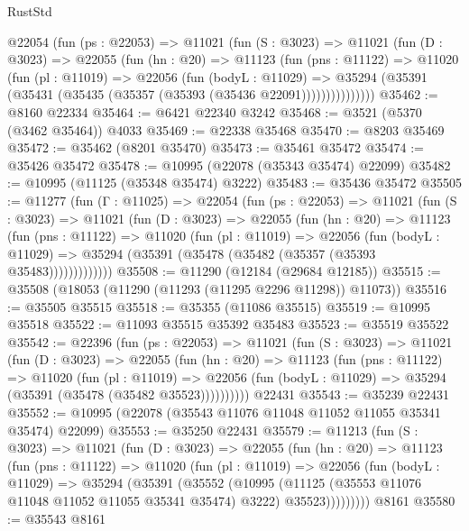 \begin{lexlean}{RustStd}
\begin{coremodule}
      @22054
        (fun (ps : @22053) =>
        @11021
          (fun (S : @3023) =>
          @11021
            (fun (D : @3023) =>
            @22055
              (fun (hn : @20) =>
              @11123
                (fun (pns : @11122) =>
                @11020
                  (fun (pl : @11019) =>
                  @22056
                    (fun (bodyL : @11029) =>
                    @35294 (@35391 (@35431 (@35435 (@35357 (@35393 (@35436 @22091)))))))))))))))
@35462 := @8160 @22334
@35464 := @6421 @22340 @3242
@35468 := @3521 (@5370 (@3462 @35464)) @4033
@35469 := @22338 @35468
@35470 := @8203 @35469
@35472 := @35462 (@8201 @35470)
@35473 := @35461 @35472
@35474 := @35426 @35472
@35478 := @10995 (@22078 (@35343 @35474) @22099)
@35482 := @10995 (@11125 (@35348 @35474) @3222)
@35483 := @35436 @35472
@35505 := @11277
    (fun (Γ : @11025) =>
    @22054
      (fun (ps : @22053) =>
      @11021
        (fun (S : @3023) =>
        @11021
          (fun (D : @3023) =>
          @22055
            (fun (hn : @20) =>
            @11123
              (fun (pns : @11122) =>
              @11020
                (fun (pl : @11019) =>
                @22056
                  (fun (bodyL : @11029) =>
                  @35294 (@35391 (@35478 (@35482 (@35357 (@35393 @35483)))))))))))))
@35508 := @11290 (@12184 (@29684 @12185))
@35515 := @35508 (@18053 (@11290 (@11293 (@11295 @2296 @11298)) @11073))
@35516 := @35505 @35515
@35518 := @35355 (@11086 @35515)
@35519 := @10995 @35518
@35522 := @11093 @35515 @35392 @35483
@35523 := @35519 @35522
@35542 := @22396
    (fun (ps : @22053) =>
    @11021
      (fun (S : @3023) =>
      @11021
        (fun (D : @3023) =>
        @22055
          (fun (hn : @20) =>
          @11123
            (fun (pns : @11122) =>
            @11020
              (fun (pl : @11019) =>
              @22056 (fun (bodyL : @11029) => @35294 (@35391 (@35478 (@35482 @35523))))))))))
    @22431
@35543 := @35239 @22431
@35552 := @10995 (@22078 (@35543 @11076 @11048 @11052 @11055 @35341 @35474) @22099)
@35553 := @35250 @22431
@35579 := @11213
    (fun (S : @3023) =>
    @11021
      (fun (D : @3023) =>
      @22055
        (fun (hn : @20) =>
        @11123
          (fun (pns : @11122) =>
          @11020
            (fun (pl : @11019) =>
            @22056
              (fun (bodyL : @11029) =>
              @35294
                (@35391
                  (@35552
                    (@10995
                      (@11125 (@35553 @11076 @11048 @11052 @11055 @35341 @35474) @3222)
                      @35523)))))))))
    @8161
@35580 := @35543 @8161

\end{coremodule}
\end{lexlean}
